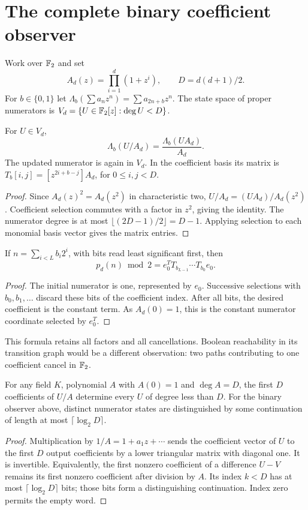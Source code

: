 \section{The complete binary coefficient observer}
\label{sec:observer}

Work over $\mathbb F_2$ and set
\[
 A_d(z)=\prod_{i=1}^d(1+z^i),\qquad D=d(d+1)/2.
\]
For $b\in\{0,1\}$ let
$\Lambda_b(\sum a_nz^n)=\sum a_{2n+b}z^n$.
The state space of proper numerators is
$V_d=\{U\in\mathbb F_2[z]:\deg U<D\}$.

\begin{lemma}\label{lem:matrix}
For $U\in V_d$,
\[
 \Lambda_b(U/A_d)=\frac{\Lambda_b(UA_d)}{A_d}.
\]
The updated numerator is again in $V_d$. In the coefficient basis its
matrix is
$T_b[i,j]=[z^{2i+b-j}]A_d$, for $0\le i,j<D$.
\end{lemma}
\begin{proof}
Since $A_d(z)^2=A_d(z^2)$ in characteristic two,
$U/A_d=(UA_d)/A_d(z^2)$. Coefficient selection commutes with a
factor in $z^2$, giving the identity. The numerator degree is at
most $\lfloor(2D-1)/2\rfloor=D-1$. Applying selection to each
monomial basis vector gives the matrix entries.
\end{proof}

\begin{theorem}\label{thm:observer}
If $n=\sum_{i<L}b_i2^i$, with bits read least significant first,
then
\[
 p_d(n)\bmod2=e_0^{T}T_{b_{L-1}}\cdots T_{b_0}e_0.
\]
\end{theorem}
\begin{proof}
The initial numerator is one, represented by $e_0$. Successive
selections with $b_0,b_1,\ldots$ discard these bits of the
coefficient index. After all bits, the desired coefficient is the
constant term. As $A_d(0)=1$, this is the constant numerator
coordinate selected by $e_0^T$.
\end{proof}

This formula retains all factors and all cancellations. Boolean
reachability in its transition graph would be a different observation:
two paths contributing to one coefficient cancel in $\mathbb F_2$.

\begin{lemma}\label{lem:observable}
For any field $K$, polynomial $A$ with $A(0)=1$ and $\deg A=D$,
the first $D$ coefficients of $U/A$ determine every $U$ of degree
less than $D$. For the binary observer above, distinct numerator
states are distinguished by some continuation of length at most
$\lceil\log_2 D\rceil$.
\end{lemma}
\begin{proof}
Multiplication by $1/A=1+a_1z+\cdots$ sends the coefficient
vector of $U$ to the first $D$ output coefficients by a lower
triangular matrix with diagonal one. It is invertible. Equivalently,
the first nonzero coefficient of a difference $U-V$ remains its
first nonzero coefficient after division by $A$. Its index $k<D$
has at most $\lceil\log_2D\rceil$ bits; those bits form a
distinguishing continuation. Index zero permits the empty word.
\end{proof}


